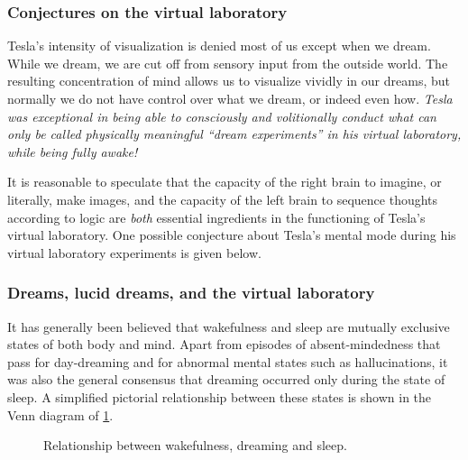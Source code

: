\documentclass[
  a4paper,
]{article}
\begin{document}
\hypertarget{conjectures-on-the-virtual-laboratory}{%
\subsubsection{Conjectures on the virtual
laboratory}\label{conjectures-on-the-virtual-laboratory}}

Tesla's intensity of visualization is denied most of us except when we
dream. While we dream, we are cut off from sensory input from the
outside world. The resulting concentration of mind allows us to
visualize vividly in our dreams, but normally we do not have control
over what we dream, or indeed even how. \emph{Tesla was exceptional in
being able to consciously and volitionally conduct what can only be
called physically meaningful ``dream experiments'' in his virtual
laboratory, while being fully awake!}

It is reasonable to speculate that the capacity of the right brain to
imagine, or literally, make images, and the capacity of the left brain
to sequence thoughts according to logic are \emph{both} essential
ingredients in the functioning of Tesla's virtual laboratory. One
possible conjecture about Tesla's mental mode during his virtual
laboratory experiments is given below.

\hypertarget{dreams-lucid-dreams-and-the-virtual-laboratory}{%
\subsubsection{Dreams, lucid dreams, and the virtual
laboratory}\label{dreams-lucid-dreams-and-the-virtual-laboratory}}

It has generally been believed that wakefulness and sleep are mutually
exclusive states of both body and mind. Apart from episodes of
absent-mindedness that pass for day-dreaming and for abnormal mental
states such as hallucinations, it was also the general consensus that
dreaming occurred only during the state of sleep. A simplified pictorial
relationship between these states is shown in the Venn diagram of
\cref{fig:three-states}.

\begin{figure}
\hypertarget{fig:three-states}{%
\centering

\caption[Relationship between wakefulness, dreaming and
sleep.]{Relationship between wakefulness, dreaming and
sleep.\footnotemark{}}\label{fig:three-states}
}
\end{figure}
\end{document}
